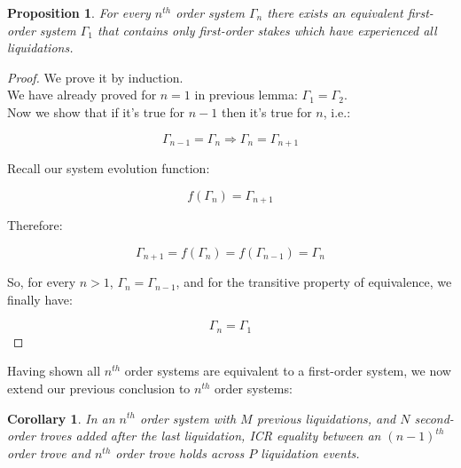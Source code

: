 \documentclass[reqno]{article}
\newtheorem{corollary}{Corollary}[theorem]
\newtheorem{proposition}[theorem]{Proposition}
\begin{document}
\begin{proposition} \label{result:6}
  For every $n^{th}$ order system $\Gamma_n$ there exists an equivalent first-order system $\Gamma_1$ that contains only first-order stakes which have experienced all liquidations.
\end{proposition}

\begin{proof}
  We prove it by induction.\\
  We have already proved for $n=1$ in previous lemma: $\Gamma_1=\Gamma_2$.\\
  Now we show that if it’s true for $n-1$ then it’s true for $n$, i.e.:

\begin{equation}
    \Gamma_{n-1} = \Gamma_n \Rightarrow \Gamma_n = \Gamma_{n+1}
\end{equation}

Recall our system evolution function: 

\begin{equation} 
    f(\Gamma_n)=\Gamma_{n+1}
\end{equation}

Therefore:

\begin{equation} 
    \Gamma_{n+1} = f(\Gamma_n) = f(\Gamma_{n-1}) = \Gamma_n
\end{equation}

\bigskip
So, for every $n > 1$, $\Gamma_n = \Gamma_{n-1}$, and for the transitive property of equivalence, we finally have:

\begin{equation}
    \Gamma_n=\Gamma_1
\end{equation}
\end{proof}

\bigskip
Having shown all $n^{th}$ order systems are equivalent to a first-order system, we now extend our previous conclusion to $n^{th}$ order systems:

\begin{corollary} \label{result:7}
  In an $n^{th}$ order system with $M$ previous liquidations, and $N$ second-order troves added after the last liquidation, ICR equality between an $(n-1)^{th}$ order trove and $n^{th}$ order trove holds across $P$ liquidation events.
\end{corollary}
\end{document}
